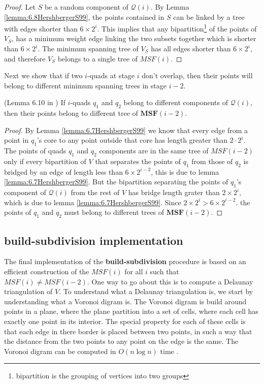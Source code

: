 \begin{proof}
Let $S$ be a random component of $\mathcal{Q}(i)$. By Lemma \ref{lemma:6.8HershbergerS99}, the points 
contained in $S$ can be linked by a tree with edges shorter than $6 \times 2^i$. This implies that 
any bipartition\footnote{bipartition is the grouping of vertices into two groups} of the points of 
$V_S$, has a minimum weight edge linking the two subsets together which is shorter than $6 \times 2^i$. 
The minimum spanning tree of $V_S$ has all edges shorter than $6 \times 2^i$, and therefore $V_S$ 
belongs to a single tree of $MSF(i)$.
\end{proof}

Next we show that if two $i$-quads at stage $i$ don't overlap, then their points will belong to 
different minimum spanning trees in stage $i-2$.

\begin{Lemma} (Lemma 6.10 in \cite{HershbergerS99}) \label{lemma:6.10HershbergerS99}
If $i$-quads $q_1$ and $q_2$ belong to different components of $\mathcal{Q}(i)$, then their points 
belong to different tree of $\mathbf{MSF}(i-2)$.
\end{Lemma}

\begin{proof}
By Lemma \ref{lemma:6.7HershbergerS99} we know that every edge from a point in $q_1$'s core to any point 
outside that core has length greater than $2 \cdot 2^i$. The points of quads $q_1$ and $q_2$ components 
are in the same tree of $MSF(i-2)$ only if every bipartition of $V$ that separates the points of $q_1$ 
from those of $q_2$ is bridged by an edge of length less than $6 \times 2^{i-2}$, this is due to lemma 
\ref{lemma:6.7HershbergerS99}. But the bipartition separating the points of $q_1$'s component of 
$\mathcal{Q}(i)$ from the rest of $V$ has bridge length grater than $2 \times 2^i$, which is due to 
lemma \ref{lemma:6.7HershbergerS99}. Since $2 \times 2^i > 6 \times 2^{i-2}$. the points of $q_1$ and 
$q_2$ must belong to different trees of $\mathbf{MSF}(i-2)$.
\end{proof}

\subsection{\textbf{build-subdivision} implementation}

The final implementation of the \textbf{build-subdivision} procedure is based on an efficient 
construction of the $MSF(i)$ for all $i$ such that $MSF(i) \neq MSF(i-2)$. One way to go 
about this is to compute a Delaunay triangulation of $V$. To understand what a Delaunay triangulation 
is, we start by understanding what a Voronoi digram is. The Voronoi digram is build around points in a 
plane, where the plane partition into a set of cells, where each cell has exactly one point in its 
interior. The special property for each of these cells is that each edge in there border is placed 
between two points, in such a way that the distance from the two points to any point on the edge is the 
same. The Voronoi digram can be computed in $O(n \log n)$ time \cite{CompGeo}. 

